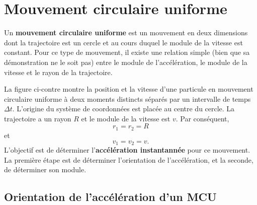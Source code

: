 \section{Mouvement circulaire uniforme}

Un \textbf{mouvement circulaire uniforme} est un mouvement en deux dimensions
dont la trajectoire est un cercle et au cours duquel le module de la vitesse
est constant.  Pour ce type de mouvement, il existe une relation simple (bien
que sa démonstration ne le soit pas) entre le module de l'accélération, le
module de la vitesse et le rayon de la trajectoire.

\begin{marginfigure}
\end{marginfigure}
La figure ci-contre montre la position et la vitesse d'une particule en
mouvement circulaire uniforme à deux moments distincts séparés par un
intervalle de temps $\Delta t$.  L'origine du système de coordonnées est placée
au centre du cercle.  La trajectoire a un rayon $R$ et le module de la vitesse
est $v$.  Par conséquent,
\[
  r_1 = r_2 = R
\]
et
\[
  v_1 = v_2 = v.
\]
L'objectif est de déterminer l'\textbf{accélération instantannée} pour ce
mouvement.  La première étape est de déterminer l'orientation de
l'accélération, et la seconde, de déterminer son module.


\subsection{Orientation de l'accélération d'un MCU}

